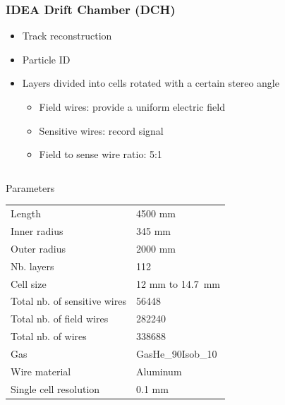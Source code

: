 \documentclass[aspectratio=169, hyperref={colorlinks=true,pdfpagelabels=false,linkcolor=black}, xcolor=dvipsnames,10pt]{beamer}
\begin{document}
\begin{frame}
\end{frame}

\begin{frame}
	\frametitle{IDEA Drift Chamber (DCH)}
	

	\begin{itemize}
	\item Track reconstruction
	\item Particle ID
	\item Layers divided into cells rotated with a certain stereo angle
		\begin{itemize}
		\item Field wires: provide a uniform electric field
		\item Sensitive wires: record signal
		\item Field to sense wire ratio: 5:1
		\end{itemize}
	\end{itemize}		
	
	\begin{columns}	
		\begin{block}{Parameters}
  \begin{table}
    \begin{adjustbox}{max width=\textwidth}
      \begin{tabular}{l l}
        \toprule
        Length & 4500 mm \\ 
        Inner radius & 345 mm \\
        Outer radius & 2000 mm\\
        Nb. layers & 112 \\
        Cell size & 12 mm to 14.7~mm\\
        Total nb. of sensitive wires & 56448 \\
        Total nb. of field wires & 282240 \\
        Total nb. of wires & 338688 \\
        Gas & GasHe\_90Isob\_10 \\
        Wire material & Aluminum \\
        Single cell resolution & 0.1 mm \\
        \bottomrule
      \end{tabular}
    \end{adjustbox}
  \end{table}
		\end{block}



\end{columns}
\end{frame}
\end{document}
